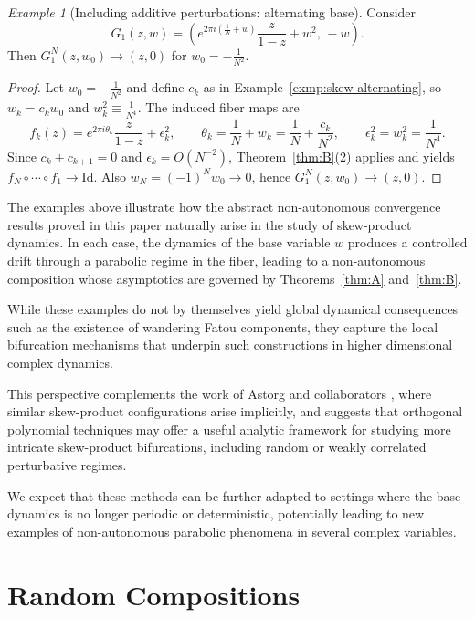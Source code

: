 \documentclass{amsart}
\theoremstyle{remark}
\newtheorem{exmp}{Example}
\theoremstyle{definition}
\begin{document}
\begin{exmp}[Including additive perturbations: alternating base]
Consider
\[
G_1(z,w)=\left(e^{2\pi i(\frac{1}{N}+w)}\frac{z}{1-z}+w^2,\,-w\right).
\]
Then $G_1^{N}(z,w_0)\to (z,0)$ for $w_0=-\frac{1}{N^2}$.
\end{exmp}

\begin{proof}
Let $w_0=-\frac{1}{N^2}$ and define $c_k$ as in Example~\ref{exmp:skew-alternating}, so $w_k=c_k w_0$ and $w_k^2\equiv \frac{1}{N^4}$. The induced fiber maps are
\[
f_k(z)=e^{2\pi i\theta_k}\frac{z}{1-z}+\epsilon_k^2,
\qquad 
\theta_k=\frac{1}{N}+w_k=\frac{1}{N}+\frac{c_k}{N^2},
\qquad 
\epsilon_k^2=w_k^2=\frac{1}{N^4}.
\]
Since $c_k+c_{k+1}=0$ and $\epsilon_k=O(N^{-2})$, Theorem~\ref{thm:B}(2) applies and yields
\(
f_N\circ\cdots\circ f_1\to \mathrm{Id}.
\)
Also $w_N=(-1)^N w_0\to 0$, hence $G_1^{N}(z,w_0)\to (z,0)$.
\end{proof}

The examples above illustrate how the abstract non-autonomous convergence results proved in this paper naturally arise in the study of skew-product dynamics.  
In each case, the dynamics of the base variable $w$ produces a controlled drift through a parabolic regime in the fiber, leading to a non-autonomous composition whose asymptotics are governed by Theorems~\ref{thm:A} and~\ref{thm:B}.  

While these examples do not by themselves yield global dynamical consequences such as the existence of wandering Fatou components, they capture the local bifurcation mechanisms that underpin such constructions in higher dimensional complex dynamics.

This perspective complements the work of Astorg and collaborators \cite{ABD+16, AstBoc22}, where similar skew-product configurations arise implicitly, and suggests that orthogonal polynomial techniques may offer a useful analytic framework for studying more intricate skew-product bifurcations, including random or weakly correlated perturbative regimes.  

We expect that these methods can be further adapted to settings where the base dynamics is no longer periodic or deterministic, potentially leading to new examples of non-autonomous parabolic phenomena in several complex variables.



    

\section{Random Compositions}\label{sec:randomcompositions}
\end{document}
